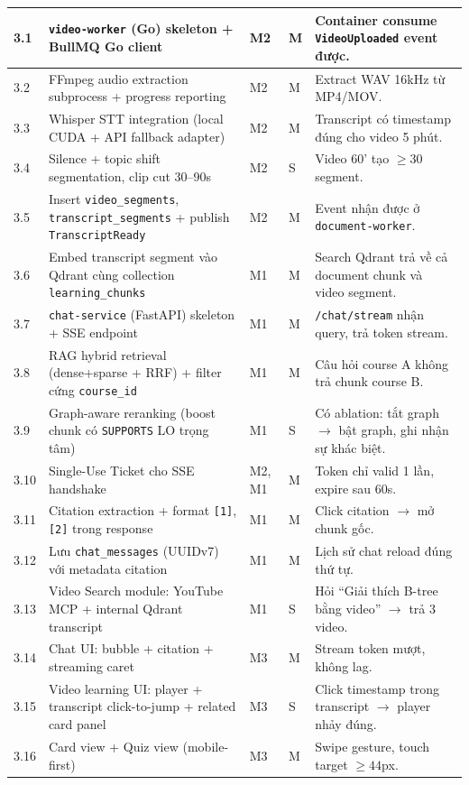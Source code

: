 \begin{longtable}{|p{0.7cm}|p{6.3cm}|p{1.2cm}|p{1cm}|p{3cm}|}
    3.1 & \texttt{video-worker} (Go) skeleton + BullMQ Go client & M2 & M & Container consume \texttt{VideoUploaded} event được. \\ \hline
    3.2 & FFmpeg audio extraction subprocess + progress reporting & M2 & M & Extract WAV 16kHz từ MP4/MOV. \\ \hline
    3.3 & Whisper STT integration (local CUDA + API fallback adapter) & M2 & M & Transcript có timestamp đúng cho video 5 phút. \\ \hline
    3.4 & Silence + topic shift segmentation, clip cut 30--90s & M2 & S & Video 60' tạo $\geq 30$ segment. \\ \hline
    3.5 & Insert \texttt{video\_segments}, \texttt{transcript\_segments} + publish \texttt{TranscriptReady} & M2 & M & Event nhận được ở \texttt{document-worker}. \\ \hline
    3.6 & Embed transcript segment vào Qdrant cùng collection \texttt{learning\_chunks} & M1 & M & Search Qdrant trả về cả document chunk và video segment. \\ \hline
    3.7 & \texttt{chat-service} (FastAPI) skeleton + SSE endpoint & M1 & M & \texttt{/chat/stream} nhận query, trả token stream. \\ \hline
    3.8 & RAG hybrid retrieval (dense+sparse + RRF) + filter cứng \texttt{course\_id} & M1 & M & Câu hỏi course A không trả chunk course B. \\ \hline
    3.9 & Graph-aware reranking (boost chunk có \texttt{SUPPORTS} LO trọng tâm) & M1 & S & Có ablation: tắt graph $\to$ bật graph, ghi nhận sự khác biệt. \\ \hline
    3.10 & Single-Use Ticket cho SSE handshake & M2, M1 & M & Token chỉ valid 1 lần, expire sau 60s. \\ \hline
    3.11 & Citation extraction + format \texttt{[1]}, \texttt{[2]} trong response & M1 & M & Click citation $\to$ mở chunk gốc. \\ \hline
    3.12 & Lưu \texttt{chat\_messages} (UUIDv7) với metadata citation & M1 & M & Lịch sử chat reload đúng thứ tự. \\ \hline
    3.13 & Video Search module: YouTube MCP + internal Qdrant transcript & M1 & S & Hỏi ``Giải thích B-tree bằng video'' $\to$ trả 3 video. \\ \hline
    3.14 & Chat UI: bubble + citation + streaming caret & M3 & M & Stream token mượt, không lag. \\ \hline
    3.15 & Video learning UI: player + transcript click-to-jump + related card panel & M3 & S & Click timestamp trong transcript $\to$ player nhảy đúng. \\ \hline
    3.16 & Card view + Quiz view (mobile-first) & M3 & M & Swipe gesture, touch target $\geq 44$px. \\ \hline
\end{longtable}

